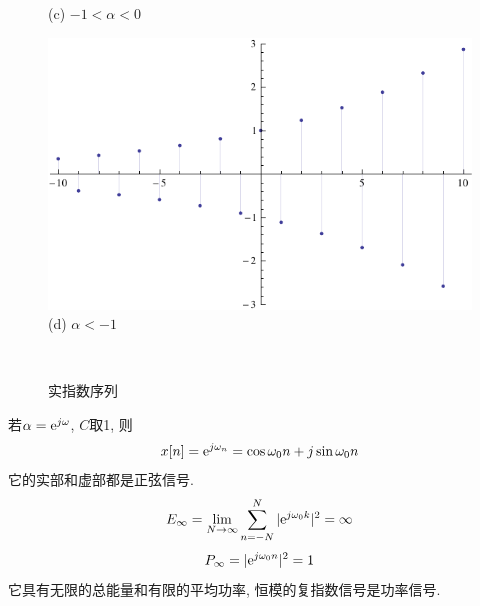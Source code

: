 \begin{figure}[h]
\begin{minipage}{0.4\linewidth}
                    (c) $-1<\alpha<0$
                \end{minipage}
                \begin{minipage}{0.4\linewidth}\centering
                    \includegraphics[width=0.8\linewidth]{signals_chaps/lect2_inc/dt-sample-d.pdf}\\
                    (d) $\alpha<-1$
                \end{minipage}\\
                \caption{实指数序列}
                \label{fig:2:dt-comp-singals}
            \end{figure}

            若$\alpha=\mathrm{e}^{j\omega}$, $C$取1, 则
            \[x[n]=\mathrm{e}^{j\omega_n}=\cos\omega_0n+j\sin\omega_0n\]
            它的实部和虚部都是正弦信号. 
            \[E_\infty=\lim_{N\to\infty}\sum_{n=-N}^N|\mathrm{e}^{j\omega_0k}|^2=\infty\]
            \[P_\infty=|\mathrm{e}^{j\omega_0n}|^2=1\]
            它具有无限的总能量和有限的平均功率, 恒模的复指数信号是功率信号.

